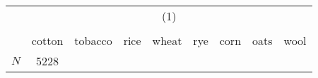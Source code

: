 {
\def\sym#1{\ifmmode^{#1}\else\(^{#1}\)\fi}
\begin{tabular}{l*{1}{cccccccc}}
\hline\hline
            &\multicolumn{8}{c}{(1)}                                                                                \\
            &\multicolumn{8}{c}{}                                                                                   \\
            &      cotton&     tobacco&        rice&       wheat&         rye&        corn&        oats&        wool\\
\hline
\hline
\(N\)       &        5228&            &            &            &            &            &            &            \\
\hline\hline
\end{tabular}
}
